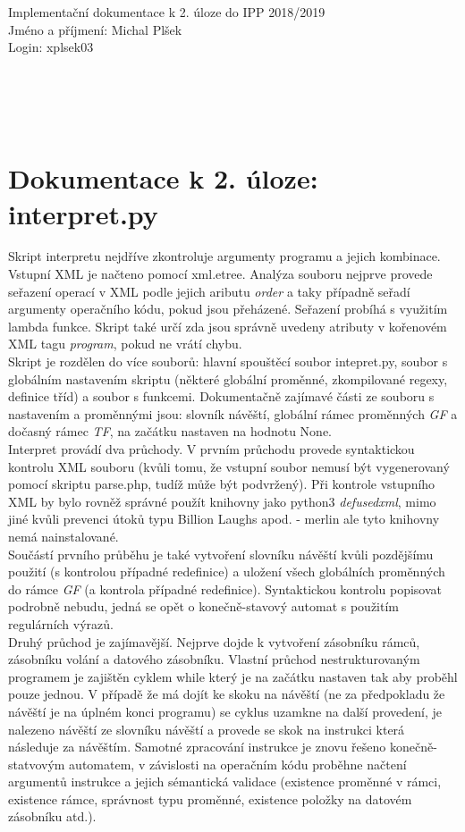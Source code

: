 \documentclass[10pt]{article}
\begin{document}
\noindent
Implementační dokumentace k 2. úloze do IPP 2018/2019
\\
Jméno a příjmení: Michal Plšek\\
Login: xplsek03\\\\\\\\\\
\section*{Dokumentace k 2. úloze: interpret.py}
Skript interpretu nejdříve zkontroluje argumenty programu a jejich kombinace. Vstupní XML je načteno pomocí xml.etree. Analýza souboru nejprve provede seřazení operací v XML podle jejich aributu \textit{order} a taky případně seřadí argumenty operačního kódu, pokud jsou přeházené. Seřazení probíhá s využitím lambda funkce. Skript také určí zda jsou správně uvedeny atributy v kořenovém XML tagu \textit{program}, pokud ne vrátí chybu.
\\
Skript je rozdělen do více souborů: hlavní spouštěcí soubor intepret.py, soubor s globálním nastavením skriptu (některé globální proměnné, zkompilované regexy, definice tříd) a soubor s funkcemi. Dokumentačně zajímavé části ze souboru s nastavením a proměnnými jsou: slovník návěští, globální rámec proměnných \textit{GF} a dočasný rámec \textit{TF}, na začátku nastaven na hodnotu None.\\
Interpret provádí dva průchody. V prvním průchodu provede syntaktickou kontrolu XML souboru (kvůli tomu, že vstupní soubor nemusí být vygenerovaný pomocí skriptu parse.php, tudíž může být podvržený). Při kontrole vstupního XML by bylo rovněž správné použít knihovny jako python3 \textit{defusedxml}, mimo jiné kvůli prevenci útoků typu Billion Laughs apod. - merlin ale tyto knihovny nemá nainstalované.\\
Součástí prvního průběhu je také vytvoření slovníku návěští kvůli pozdějšímu použití (s kontrolou případné redefinice) a uložení všech globálních proměnných do rámce \textit{GF} (a kontrola případné redefinice). Syntaktickou kontrolu popisovat podrobně nebudu, jedná se opět o konečně-stavový automat s použitím regulárních výrazů.\\
Druhý průchod je zajímavější. Nejprve dojde k vytvoření zásobníku rámců, zásobníku volání a datového zásobníku. Vlastní průchod nestrukturovaným programem je zajištěn cyklem while který je na začátku nastaven tak aby proběhl pouze jednou. V případě že má dojít ke skoku na návěští (ne za předpokladu že návěští je na úplném konci programu) se cyklus uzamkne na další provedení, je nalezeno návěští ze slovníku návěští a provede se skok na instrukci která následuje za návěštím. Samotné zpracování instrukce je znovu řešeno konečně-statvovým automatem, v závislosti na operačním kódu proběhne načtení argumentů instrukce a jejich sémantická validace (existence proměnné v rámci, existence rámce, správnost typu proměnné, existence položky na datovém zásobníku atd.).\\
\end{document}
